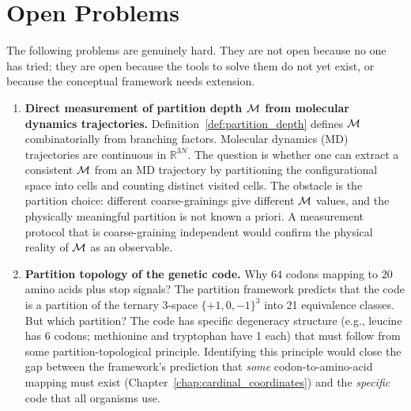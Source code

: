 \section{Open Problems}
\label{sec:open_problems}

The following problems are genuinely hard. They are not open because no one
has tried; they are open because the tools to solve them do not yet exist,
or because the conceptual framework needs extension.

\begin{enumerate}[label=\textbf{OP\arabic*.}]
  \item \textbf{Direct measurement of partition depth $\mathcal{M}$ from molecular
        dynamics trajectories.}
        Definition~\ref{def:partition_depth} defines $\mathcal{M}$ combinatorially
        from branching factors. Molecular dynamics (MD) trajectories are
        continuous in $\mathbb{R}^{3N}$. The question is whether one can extract
        a consistent $\mathcal{M}$ from an MD trajectory by partitioning the
        configurational space into cells and counting distinct visited cells.
        The obstacle is the partition choice: different coarse-grainings give
        different $\mathcal{M}$ values, and the physically meaningful partition is
        not known a priori. A measurement protocol that is coarse-graining
        independent would confirm the physical reality of $\mathcal{M}$ as an
        observable.

  \item \textbf{Partition topology of the genetic code.}
        Why 64 codons mapping to 20 amino acids plus stop signals? The partition
        framework predicts that the code is a partition of the ternary 3-space
        $\{+1,0,-1\}^3$ into 21 equivalence classes. But which partition? The
        code has specific degeneracy structure (e.g., leucine has 6 codons;
        methionine and tryptophan have 1 each) that must follow from some
        partition-topological principle. Identifying this principle would close
        the gap between the framework's prediction that \emph{some} codon-to-amino-acid
        mapping must exist (Chapter~\ref{chap:cardinal_coordinates}) and the
        \emph{specific} code that all organisms use.


\end{enumerate}
